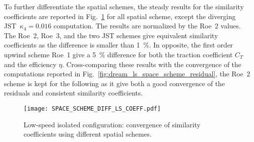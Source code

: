 To further differentiate the spatial schemes, 
the steady results for the similarity coefficients are reported
in Fig.~\ref{fig:dream_ls_space_scheme_coeff} for all spatial scheme, 
except the diverging JST~$\kappa_4 = 0.016$ computation.
The results are normalized by the Roe~2 values.
The Roe~2, Roe~3, and the two JST schemes give equivalent
similarity coefficients as the difference is smaller than 1~\%.
In opposite, the first order upwind scheme Roe~1 give a 5~\%
difference for both the traction coefficient $C_T$ and the efficiency $\eta$.
Cross-comparing these results with the convergence of the computations
reported in Fig.~\ref{fig:dream_ls_space_scheme_residual}, the Roe~2
scheme is kept for the following as it give both a good convergence
of the residuals and consistent similarity coefficients.
\begin{figure}[htp]
  \centering
  \texttt{[image: SPACE\_SCHEME\_DIFF\_LS\_COEFF.pdf]}
  \caption{Low-speed isolated configuration: convergence of 
  similarity coefficients using different spatial schemes.}
  \label{fig:dream_ls_space_scheme_coeff}
\end{figure}
